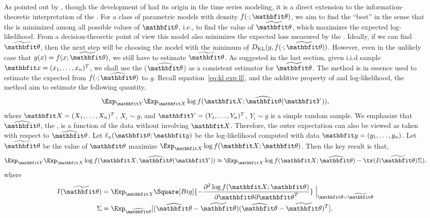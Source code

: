 \documentclass[11pt, hyper, bib, fontset=Minion]{marticle}
\begin{document}
As pointed out by \textcite{Bozdogan:1987wy}, though the development of \aic
had its origin in the time series modeling, it is a direct extension to the
information-theoretic interpretation of the \mle. For a class of parametric
models with density $f(\cdot;\bth)$, we aim to find the ``best'' in the sense
that the \kl is minimized among all possible values of $\bth$, i.e., to find
the value of $\tbth$, which maximizes the expected log-likelihood.  From a
decision-theoretic point of view this model also minimizes the expected loss
measured by the \kl \parencite{Akaike:1973uc}. Ideally, if we can find
$\tbth$, then the next step will be choosing the model with the minimum of
$D_{\mathrm{KL}}(g,f(\cdot;\tbth))$. However, even in the unlikely case that
$g(x) = f(x;\tbth)$, we still have to estimate $\tbth$. As suggested in the
last section, given i.i.d sample $\bfx = (x_1,\dots,x_n)^T$, we shall use the
\mle ($\hbth$) as a consistent estimator for $\tbth$. The \aic method is in
essence used to estimate the expected \kl from $f(\cdot; \hbth)$ to $g$.
Recall equation~\eqref{eq:kl exp ll}, and the additive property of \kl and
log-likelihood, the \aic method aim to estimate the following quantity,
\begin{equation}
  \Exp_{\bfY}\Exp_{\bfX}\log f(\bfX;\hbth(\bfY)),
\end{equation}
where $\bfX = (X_1,\dots,X_n)^T$, $X_i \sim g$, and $\bfY =
(Y_1,\dots,Y_n)^T$, $Y_i \sim g$ is a simple random sample. We emphasize that
$\hbth$, the \mle, is a function of the data without involving $\bfX$.
Therefore, the outer expectation can also be viewed as taken with respect to
$\hbth$. Let $\ell_n(\bth;\bfy)$ be the log-likelihood computed with data
$\bfy = (y_1,\dots,y_n)$. Let $\tbth$ be the value of $\bth$ maximize
$\Exp_{\bfX}\log f(\bfX;\bth)$. Then the key result is that,
\begin{equation}
  \Exp_{\bfY}\Exp_{\bfX}\log f(\bfX;\hbth(\bfY))
  \approx \Exp_{\bfX}\log f(\bfX;\hbth) - \tr(I(\tbth)\Sigma),
  \label{eq:aic general}
\end{equation}
where
\begin{align}
  I(\tbth)
  & = \Exp_{\bfX}\Square[Big]{
    -\frac{\partial^2\log f(\bfX;\bth)}{\partial\bth\partial\bth^T}}
  \Bigm|_{\bth=\tbth} \\
  \Sigma &= \Exp_{\hbth}[(\hbth-\tbth)(\hbth-\tbth)^T].
\end{align}
\end{document}
